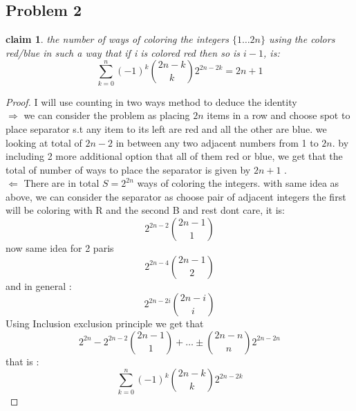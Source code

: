 \documentclass[12pt]{article}
\newtheorem*{claim*}{claim}
\begin{document}
\subsection*{Problem 2}
\begin{claim*}the number of ways of coloring the integers $\{ 1 \dots 2n \}$ using the colors red/blue in such a way that if i is colored red then so is $i-1$, is:
\[\sum^n_{k=0}(-1)^k\binom{2n-k}{k}2^{2n-2k}=2n+1
\]
\end{claim*}
\begin{proof} I will use  counting in two ways method to deduce the identity\\
$\Rightarrow$ we can consider the problem as placing $2n$ items in a row and choose spot to place separator s.t any item to its left are red and all the other are blue. we looking at total of $2n-2$ in between  any two adjacent numbers from 1 to $2n$. by including 2 more additional option that all of them red or blue, we get that the total of number of ways to place the separator is given by $2n+1$ .\\
$\Leftarrow$ 
There are in total $S=2^{2n}$ ways of coloring the integers. with same idea as above, we can consider the separator as choose pair of adjacent integers the first will be coloring with R and the second B and rest dont care, it is:
\[2^{2n-2}\binom{2n-1}{1}
\]
now same idea for 2 paris
\[2^{2n-4}\binom{2n-1}{2}
\]
and in general :
\[2^{2n-2i}\binom{2n-i}{i}
\]
Using Inclusion exclusion principle we get that
\[2^{2n}-2^{2n-2}\binom{2n-1}{1}+\dots\pm \binom{2n-n}{n}2^{2n-2n}
\]
that is :
\[\sum^n_{k=0}(-1)^k\binom{2n-k}{k}2^{2n-2k}
\]
\end{proof}
\end{document}
